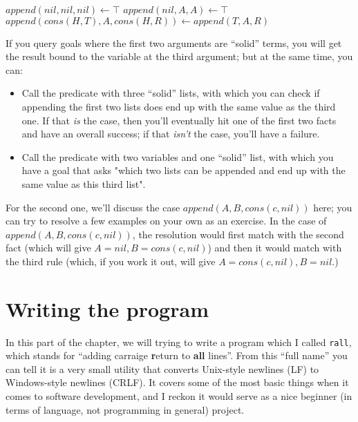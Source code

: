 \begin{algorithm}
\begin{algorithmic}
  \State $append(nil, nil, nil) \gets \top$
  \State $append(nil, A, A) \gets \top$
  \State $append(cons(H,T), A, cons(H,R)) \gets append(T,A,R)$
\end{algorithmic}
\end{algorithm}

If you query goals where the first two arguments are ``solid'' terms, you will get the result bound to the variable at the third argument; but at the same time, you can:

\begin{itemize}
	\item Call the predicate with three ``solid'' lists, with which you can check if appending the first two lists does end up with the same value as the third one. If that \emph{is} the case, then you'll eventually hit one of the first two facts and have an overall success; if that \emph{isn't} the case, you'll have a failure.
	\item Call the predicate with two variables and one ``solid'' list, with which you have a goal that asks "which two lists can be appended and end up with the same value as this third list".
\end{itemize}

For the second one, we'll discuss the case \(append(A,B,cons(c,nil))\) here; you can try to resolve a few examples on your own as an exercise. In the case of \(append(A,B,cons(c,nil))\), the resolution would first match with the second fact (which will give \(A=nil,B=cons(c,nil)\)) and then it would match with the third rule (which, if you work it out, will give \(A=cons(c,nil), B=nil\).)

\section{Writing the program}
\label{sec:org533d01d}

In this part of the chapter, we will  trying to write a program which I called \texttt{rall}, which stands for ``adding carraige \textbf{r}eturn to \textbf{all} lines''. From this ``full name'' you can tell it is a very small utility that converts Unix-style newlines (LF) to Windows-style newlines (CRLF). It covers some of the most basic things when it comes to software development, and I reckon it would serve as a nice beginner (in terms of language, not programming in general) project.


